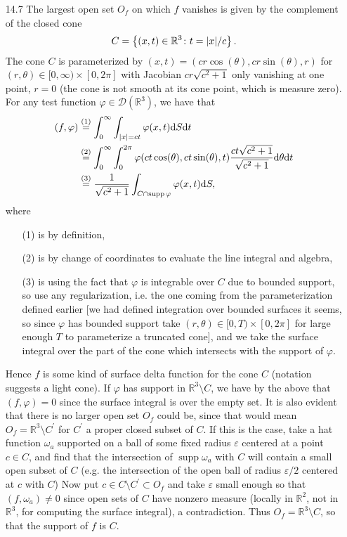 \documentclass[11pt]{article}
\newcommand{\cbr}[1]{\left\{#1\right\}}
\newcommand{\eq}[1]{\overset{(#1)}{=}}
\DeclareMathOperator{\supp}{supp}
\begin{document}
\begin{enumerate}
    \hrulefill

    \item[14.7] The largest open set $O_f$ on which $f$ vanishes is given by the complement of the closed cone \[C = \cbr{(x,t)\in\mathbb{R}^3\colon t = \abs{x}/c}.\] The cone $C$ is parameterized by $(x,t) = (cr\cos(\theta),cr\sin(\theta),r)$ for $(r,\theta)\in [0,\infty)\times[0,2\pi]$ with Jacobian $cr\sqrt{c^2+1}$ only vanishing at one point, $r = 0$ (the cone is not smooth at its cone point, which is measure zero). For any test function $\varphi\in \mathcal{D}(\mathbb{R}^3)$, we have that \begin{align*}
        (f,\varphi) &\eq{1} \int_0^\infty\int_{\abs{x} = ct}\varphi(x,t)\dd S \dd t \\
        &\eq{2} \int_0^\infty \int_0^{2\pi}\varphi(ct\cos(\theta), ct\sin(\theta), t) \frac{ct\sqrt{c^2+1}}{\sqrt{c^2+1}}\dd\theta\dd t \\
        &\eq{3} \frac{1}{\sqrt{c^2+1}}\int_{C\cap \supp\varphi}\varphi(x,t)\dd S,
    \end{align*} where \begin{enumerate}
        \item[(1)] is by definition,
        \item[(2)] is by change of coordinates to evaluate the line integral and algebra, 
        \item[(3)] is using the fact that $\varphi$ is integrable over $C$ due to bounded support, so use any regularization, i.e. the one coming from the parameterization defined earlier [we had defined integration over bounded surfaces it seems, so since $\varphi$ has bounded support take $(r,\theta)\in [0,T)\times[0,2\pi]$ for large enough $T$ to parameterize a truncated cone], and we take the surface integral over the part of the cone which intersects with the support of $\varphi$.
    \end{enumerate} Hence $f$ is some kind of surface delta function for the cone $C$ (notation suggests a light cone). If $\varphi$ has support in $\mathbb{R}^3\setminus C$, we have by the above that $(f,\varphi) = 0$ since the surface integral is over the empty set. It is also evident that there is no larger open set $O_f$ could be, since that would mean $O_f = \mathbb{R}^3\setminus C^\prime$ for $C^\prime$ a proper closed subset of $C$. If this is the case, take a hat function $\omega_a$ supported on a ball of some fixed radius $\varepsilon$ centered at a point $c\in C$, and find that the intersection of $\supp\omega_a$ with $C$ will contain a small open subset of $C$ (e.g. the intersection of the open ball of radius $\varepsilon/2$ centered at $c$ with $C$) Now put $c\in C\setminus C^\prime\subset O_f$ and take $\varepsilon$ small enough so that $(f,\omega_a)\neq 0$ since open sets of $C$ have nonzero measure (locally in $\mathbb{R}^2$, not in $\mathbb{R}^3$, for computing the surface integral), a contradiction. Thus $O_f = \mathbb{R}^3\setminus C$, so that the support of $f$ is $C$.


\end{enumerate}
\end{document}
